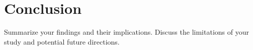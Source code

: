 \chapter{Conclusion}

Summarize your findings and their implications. Discuss the limitations of your study and potential future directions.
